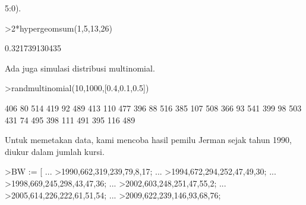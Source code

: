 \documentclass[a4paper,10pt]{article}
\begin{document}
\begin{eulernotebook}
\begin{eulercomment}
\begin{eulercomment}
\begin{eulercomment}
\begin{eulercomment}
\begin{eulercomment}
\begin{eulercomment}
\begin{eulercomment}
\begin{eulercomment}
\begin{eulercomment}
\begin{eulercomment}
\begin{eulercomment}
\begin{eulercomment}
\begin{eulercomment}
\begin{eulercomment}
\begin{eulercomment}
\begin{eulercomment}
\begin{eulercomment}
\begin{eulercomment}
\begin{eulercomment}
\begin{eulercomment}
\begin{eulercomment}
\begin{eulercomment}
\begin{eulercomment}
\begin{eulercomment}
\begin{eulercomment}
\begin{eulercomment}
\begin{eulercomment}
\begin{eulercomment}
\begin{eulercomment}
\begin{eulercomment}
\begin{eulercomment}
\begin{eulercomment}
\begin{eulercomment}
\begin{eulercomment}
\begin{eulercomment}
\begin{eulercomment}
\begin{eulercomment}
\begin{eulercomment}
\begin{eulercomment}
\begin{eulercomment}
\begin{eulercomment}
\begin{eulercomment}
\begin{eulercomment}
\begin{eulercomment}
\begin{eulercomment}
\begin{eulercomment}
\begin{eulercomment}
\begin{eulercomment}
\begin{eulercomment}
\begin{eulercomment}
\begin{eulercomment}
\begin{eulercomment}
\begin{eulercomment}
\begin{eulercomment}
\begin{eulercomment}
\begin{eulercomment}
\begin{eulercomment}
\begin{eulercomment}
\begin{eulercomment}
\begin{eulercomment}
\begin{eulercomment}
\begin{eulercomment}
\begin{eulercomment}
\begin{eulercomment}
\begin{eulercomment}
\begin{eulercomment}
\begin{eulercomment}
5:0).
\end{eulercomment}
\begin{eulerprompt}
>2*hypergeomsum(1,5,13,26)
\end{eulerprompt}
\begin{euleroutput}
  0.321739130435
\end{euleroutput}
\begin{eulercomment}
Ada juga simulasi distribusi multinomial.
\end{eulercomment}
\begin{eulerprompt}
>randmultinomial(10,1000,[0.4,0.1,0.5])
\end{eulerprompt}
\begin{euleroutput}
            406            80           514 
            419            92           489 
            413           110           477 
            396            88           516 
            385           107           508 
            366            93           541 
            399            98           503 
            431            74           495 
            398           111           491 
            395           116           489 
\end{euleroutput}
\begin{eulercomment}
Untuk memetakan data, kami mencoba hasil pemilu Jerman sejak tahun
1990, diukur dalam jumlah kursi.
\end{eulercomment}
\begin{eulerprompt}
>BW := [ ...
>1990,662,319,239,79,8,17; ...
>1994,672,294,252,47,49,30; ...
>1998,669,245,298,43,47,36; ...
>2002,603,248,251,47,55,2; ...
>2005,614,226,222,61,51,54; ...
>2009,622,239,146,93,68,76; 
\end{eulerprompt}
\end{eulercomment}
\end{eulercomment}
\end{eulercomment}
\end{eulercomment}
\end{eulercomment}
\end{eulercomment}
\end{eulercomment}
\end{eulercomment}
\end{eulercomment}
\end{eulercomment}
\end{eulercomment}
\end{eulercomment}
\end{eulercomment}
\end{eulercomment}
\end{eulercomment}
\end{eulercomment}
\end{eulercomment}
\end{eulercomment}
\end{eulercomment}
\end{eulercomment}
\end{eulercomment}
\end{eulercomment}
\end{eulercomment}
\end{eulercomment}
\end{eulercomment}
\end{eulercomment}
\end{eulercomment}
\end{eulercomment}
\end{eulercomment}
\end{eulercomment}
\end{eulercomment}
\end{eulercomment}
\end{eulercomment}
\end{eulercomment}
\end{eulercomment}
\end{eulercomment}
\end{eulercomment}
\end{eulercomment}
\end{eulercomment}
\end{eulercomment}
\end{eulercomment}
\end{eulercomment}
\end{eulercomment}
\end{eulercomment}
\end{eulercomment}
\end{eulercomment}
\end{eulercomment}
\end{eulercomment}
\end{eulercomment}
\end{eulercomment}
\end{eulercomment}
\end{eulercomment}
\end{eulercomment}
\end{eulercomment}
\end{eulercomment}
\end{eulercomment}
\end{eulercomment}
\end{eulercomment}
\end{eulercomment}
\end{eulercomment}
\end{eulercomment}
\end{eulercomment}
\end{eulercomment}
\end{eulercomment}
\end{eulercomment}
\end{eulercomment}
\end{eulernotebook}
\end{document}
